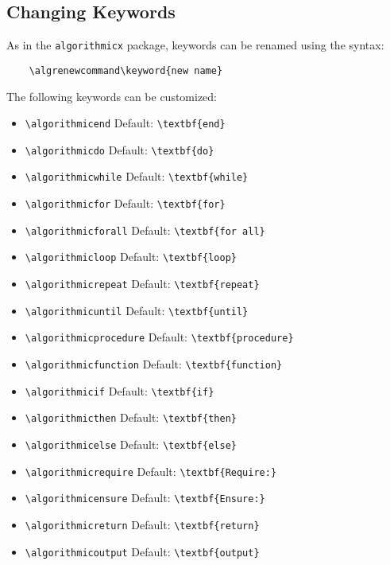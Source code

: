 \documentclass[11pt,a4paper,USenglish]{article}
\begin{document}
\subsection{Changing Keywords}
As in the \texttt{algorithmicx} package, keywords can be renamed using the syntax:
\begin{verbatim}
	\algrenewcommand\keyword{new name}
\end{verbatim}
The following keywords can be customized:
\begin{itemize}
	\item \verb|\algorithmicend|
	\hfill Default: \verb|\textbf{end}|
	\item \verb|\algorithmicdo|
	\hfill Default: \verb|\textbf{do}|
	\item \verb|\algorithmicwhile|
	\hfill Default: \verb|\textbf{while}|
	\item \verb|\algorithmicfor|
	\hfill Default: \verb|\textbf{for}|
	\item \verb|\algorithmicforall|
	\hfill Default: \verb|\textbf{for all}|
	\item \verb|\algorithmicloop|
	\hfill Default: \verb|\textbf{loop}|
	\item \verb|\algorithmicrepeat|
	\hfill Default: \verb|\textbf{repeat}|
	\item \verb|\algorithmicuntil|
	\hfill Default: \verb|\textbf{until}|
	\item \verb|\algorithmicprocedure|
	\hfill Default: \verb|\textbf{procedure}|
	\item \verb|\algorithmicfunction|
	\hfill Default: \verb|\textbf{function}|
	\item \verb|\algorithmicif|
	\hfill Default: \verb|\textbf{if}|
	\item \verb|\algorithmicthen|
	\hfill Default: \verb|\textbf{then}|
	\item \verb|\algorithmicelse|
	\hfill Default: \verb|\textbf{else}|
	\item \verb|\algorithmicrequire|
	\hfill Default: \verb|\textbf{Require:}|
	\item \verb|\algorithmicensure|
	\hfill Default: \verb|\textbf{Ensure:}|
	\item \verb|\algorithmicreturn|
	\hfill Default: \verb|\textbf{return}|
	\item \verb|\algorithmicoutput|
	\hfill Default: \verb|\textbf{output}|
\end{itemize}
\end{document}
